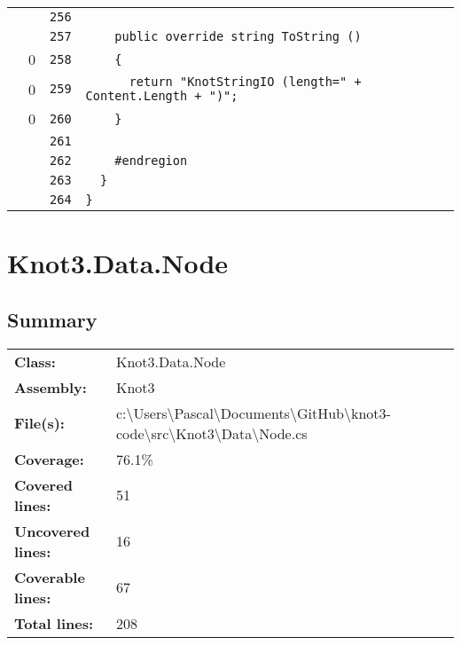 \documentclass[a4paper,10pt]{article}
\begin{document}
\begin{longtable}[l]{lrrl}
\cellcolor{gray} &  & \verb~256~ & \verb~~\\
\cellcolor{gray} &  & \verb~257~ & \verb~    public override string ToString ()~\\
\cellcolor{red} & 0 & \verb~258~ & \verb~    {~\\
\cellcolor{red} & 0 & \verb~259~ & \verb~      return "KnotStringIO (length=" + Content.Length + ")";~\\
\cellcolor{red} & 0 & \verb~260~ & \verb~    }~\\
\cellcolor{gray} &  & \verb~261~ & \verb~~\\
\cellcolor{gray} &  & \verb~262~ & \verb~    #endregion~\\
\cellcolor{gray} &  & \verb~263~ & \verb~  }~\\
\cellcolor{gray} &  & \verb~264~ & \verb~}~\\
\end{longtable}
\newpage
\section{Knot3.Data.Node}
\subsection{Summary}
\begin{longtable}[l]{ll}
\textbf{Class:} & Knot3.Data.Node\\
\textbf{Assembly:} & Knot3\\
\textbf{File(s):} & \begin{minipage}[t]{12cm}{c:\textbackslash Users\textbackslash Pascal\textbackslash Documents\textbackslash GitHub\textbackslash knot3-code\textbackslash src\textbackslash Knot3\textbackslash Data\textbackslash Node.cs}\end{minipage} \\
\textbf{Coverage:} & 76.1\%\\
\textbf{Covered lines:} & 51\\
\textbf{Uncovered lines:} & 16\\
\textbf{Coverable lines:} & 67\\
\textbf{Total lines:} & 208\\
\end{longtable}
\end{document}
